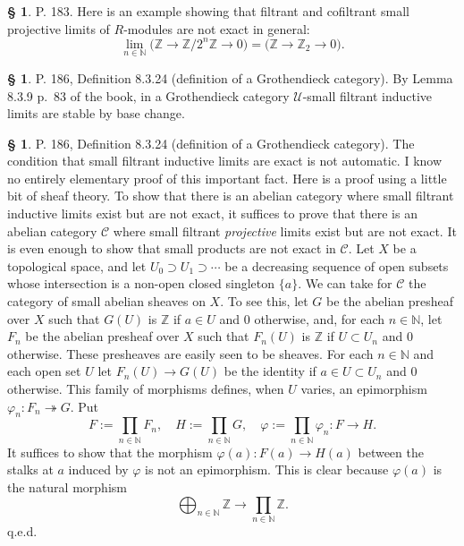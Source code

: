 \documentclass[12pt]{article}%
\theoremstyle{remark}
\theoremstyle{definition}
\newtheorem{s}[thm]{\S}%
\newcommand{\bb}{\mathbb}
\newcommand{\C}{\mathcal C}
\newcommand{\U}{\mathcal U}
\newcommand{\epi}{\twoheadrightarrow}
\begin{document}
%

\begin{s}%
P. 183. Here is an example showing that filtrant and cofiltrant small projective limits of $R$-modules are not exact in general: 
$$
\lim_{n\in\bb N}\big(\bb Z\to\bb Z/2^n\bb Z\to0\big)=\big(\bb Z\to\bb Z_2\to0\big).
$$
\end{s}

%

\begin{s}\label{gcsbc}
P. 186, Definition 8.3.24 (definition of a Grothendieck category). By Lemma 8.3.9 p.~83 of the book, in a Grothendieck category $\U$-small filtrant inductive limits are stable by base change. 
\end{s}

%

\begin{s} 
P. 186, Definition 8.3.24 (definition of a Grothendieck category). The condition that small filtrant inductive limits are exact is not automatic. I know no entirely elementary proof of this important fact. Here is a proof using a little bit of sheaf theory. To show that there is an abelian category where small filtrant inductive limits exist but are not exact, it suffices to prove that there is an abelian category $\C$ where small filtrant {\em projective} limits exist but are not exact. It is even enough to show that small products are not exact in $\C$. Let $X$ be a topological space, and let $U_0\supset U_1\supset\cdots$ be a decreasing sequence of open subsets whose intersection is a non-open closed singleton $\{a\}$. We can take for $\C$ the category of small abelian sheaves on $X$. To see this, let $G$ be the abelian presheaf over $X$ such that $G(U)$ is $\mathbb Z$ if $a\in U$ and 0 otherwise, and, for each $n\in\mathbb N$, let $F_n$ be the abelian presheaf over $X$ such that $F_n(U)$ is $\mathbb Z$ if $U\subset U_n$ and 0 otherwise. These presheaves are easily seen to be sheaves. For each $n\in\mathbb N$ and each open set $U$ let $F_n(U)\to G(U)$ be the identity if $a\in U\subset U_n$ and 0 otherwise. This family of morphisms defines, when $U$ varies, an epimorphism $\varphi_n:F_n\epi G$. Put 
$$
F:=\prod_{n\in\mathbb N}F_n,\quad H:=\prod_{n\in\mathbb N}G,\quad\varphi:=\prod_{n\in\mathbb N}\varphi_n:F\to H.
$$ 
It suffices to show that the morphism $\varphi(a):F(a)\to H(a)$ between the stalks at $a$ induced by $\varphi$ is not an epimorphism. This is clear because $\varphi(a)$ is the natural morphism 
$$
\bigoplus_{n\in\mathbb N}\mathbb Z\to\prod_{n\in\mathbb N}\mathbb Z.
$$
q.e.d.
\end{s}
\end{document}
